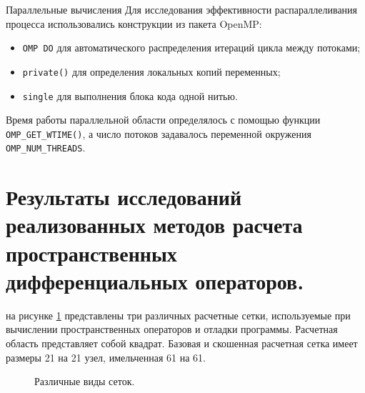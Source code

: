 {Параллельные вычисления}
Для исследования эффективности распараллеливания процесса использовались конструкции из пакета OpenMP:
\begin{itemize}
    \item \texttt{OMP DO} для автоматического распределения итераций цикла между потоками;
    \item \texttt{private()} для определения локальных копий переменных;
    \item \texttt{single} для выполнения блока кода одной нитью.
\end{itemize}

Время работы параллельной области определялось с помощью функции \texttt{OMP\_GET\_WTIME()}, а число потоков задавалось переменной окружения \texttt{OMP\_NUM\_THREADS}.


\section{Результаты исследований реализованных методов расчета пространственных дифференциальных операторов.}

на рисунке \ref{fig:10} представлены три различных расчетные сетки, используемые при вычислении пространственных операторов и отладки программы. Расчетная область представляет собой квадрат. Базовая и скошенная расчетная сетка имеет размеры 21 на 21 узел, имельченная 61 на 61.

\begin{figure}
    \centering
    \caption{Различные виды сеток.}
    \label{fig:10}
\end{figure}

